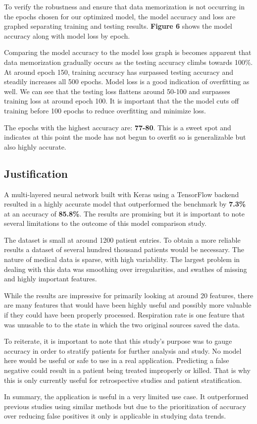 \documentclass[11pt]{article}
\begin{document}
	To verify the robustness and ensure that data memorization is not occurring in the epochs chosen for our optimized model, the model accuracy and loss are graphed separating training and testing results. \textbf{Figure 6} shows the model accuracy along with model loss by epoch.
	
	Comparing the model accuracy to the model loss graph is becomes apparent that data memorization gradually occurs as the testing accuracy climbs towards 100\%. At around epoch 150, training accuracy has surpassed testing accuracy and steadily increases all 500 epochs. Model loss is a good indication of overfitting as well. We can see that the testing loss flattens around 50-100 and surpasses training loss at around epoch 100. It is important that the the model cuts off training before 100 epochs to reduce overfitting and minimize loss. 
	
	The epochs with the highest accuracy are: \textbf{77-80}. This is a sweet spot and indicates at this point the mode has not begun to overfit so is generalizable but also highly accurate.

	
	\subsection{Justification}
	
	A multi-layered neural network built with Keras using a TensorFlow backend resulted in a highly accurate model that outperformed the benchmark by \textbf{7.3\%} at an accuracy of \textbf{85.8\%}. The results are promising but it is important to note several limitations to the outcome of this model comparison study. 
	
	The dataset is small at around 1200 patient entries. To obtain a more reliable results a dataset of several hundred thousand patients would be necessary. The nature of medical data is sparse, with high variability. The largest problem in dealing with this data was smoothing over irregularities, and swathes of missing and highly important features.
	
	While the results are impressive for primarily looking at around 20 features, there are many features that would have been highly useful and possibly more valuable if they could have been properly processed. Respiration rate is one feature that was unusable to to the state in which the two original sources saved the data.
	
	To reiterate, it is important to note that this study's purpose was to gauge accuracy in order to stratify patients for further analysis and study. No model here would be useful or safe to use in a real application. Predicting a false negative could result in a patient being treated improperly or killed. That is why this is only currently useful for retrospective studies and patient stratification.
	
	In summary, the application is useful in a very limited use case. It outperformed previous studies using similar methods but due to the prioritization of accuracy over reducing false positives it only is applicable in studying data trends.
		
	{}
	
	
\end{document}

